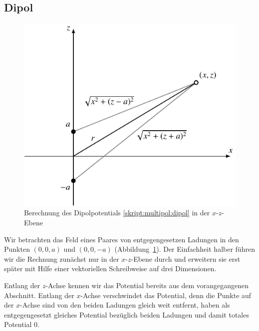 \subsection{Dipol}
\begin{figure}
\centering
\includegraphics{chapters/tikz/dipol2.pdf}
\caption{Berechnung des Dipolpotentials 
\eqref{skript:multipol:dipol} in der $x$-$z$-Ebene
\label{skript:multipol:figure:dipol}}
\end{figure}
%
Wir betrachten das Feld eines Paares von entgegengesetzen Ladungen
in den Punkten $(0,0,a)$ und $(0,0,-a)$
(Abbildung~\ref{skript:multipol:figure:dipol}).
Der Einfachheit halber führen wir die Rechnung zunächst nur
in der $x$-$z$-Ebene durch und erweitern sie erst später mit Hilfe einer
vektoriellen Schreibweise auf drei Dimensionen.

Entlang der $z$-Achse kennen wir das Potential bereits aus
dem vorangegangenen Abschnitt.
Entlang der $x$-Achse verschwindet das Potential, denn die Punkte
auf der $x$-Achse sind von den beiden Ladungen gleich weit entfernt,
haben als entgegengesetzt gleiches Potential bezüglich beiden Ladungen
und damit totales Potential 0.

